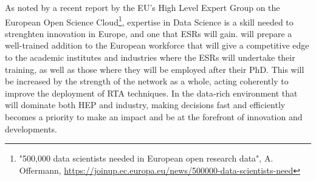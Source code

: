 As noted by a recent report by the EU's High Level
Expert Group on the European Open Science Cloud\footnote{"500,000 data scientists needed
in European open research data",
A. Offermann, \url{https://joinup.ec.europa.eu/news/500000-data-scientists-need}}, 
expertise in Data Science is a skill needed to strenghten innovation in Europe, 
and one that \acronym ESRs will gain. \acronym will prepare 
a well-trained addition to the European workforce that will give 
a competitive edge to the academic institutes and industries where the ESRs will
undertake their training, as well as those where they will be employed after their PhD.  
This will be increased by the strength of the network as a whole, 
acting coherently to improve the deployment of RTA 
techniques. In the data-rich environment that 
will dominate both HEP and industry, 
making decisions fast and efficiently becomes a priority to make an impact and
be at the forefront of innovation and developments.  





 
